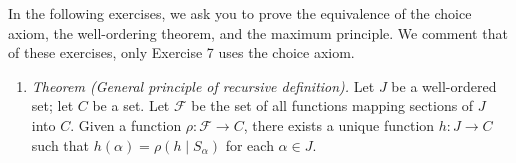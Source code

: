 
In the following exercises, we ask you to prove the equivalence of the choice axiom, 
the well-ordering theorem, and the maximum principle. We comment that of these exercises, 
only Exercise 7 uses the choice axiom.

\begin{enumerate}[itemsep=0.4em, parsep=0pt, topsep=0pt, partopsep=0pt, leftmargin=*, label=\arabic*., ref=\arabic*]
\item \textsl{Theorem (General principle of recursive definition).} Let \(J\) be a well-ordered set; let \(C\) be a set. Let \(\mathcal{F}\) be the set of all functions mapping sections of \(J\) into \(C\). Given a function \(\rho : \mathcal{F} \rightarrow C\), there exists a unique function \(h : J \rightarrow C\) such that \(h(\alpha) = \rho ({h \mid {S}_{\alpha }})\) for each \(\alpha \in J\).


\end{enumerate}
